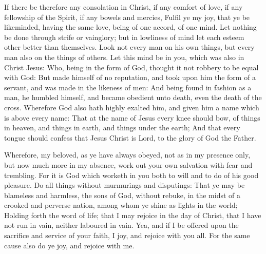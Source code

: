  If there be therefore any consolation in Christ, if any
comfort of love, if any fellowship of the Spirit, if any bowels and
mercies,  Fulfil ye my joy, that ye be likeminded, having
the same love, being of one accord, of one mind.  Let
nothing be done through strife or vainglory; but in lowliness of mind
let each esteem other better than themselves.  Look not
every man on his own things, but every man also on the things of others.
 Let this mind be in you, which was also in Christ Jesus:
 Who, being in the form of God, thought it not robbery to
be equal with God:  But made himself of no reputation, and
took upon him the form of a servant, and was made in the likeness of
men:  And being found in fashion as a man, he humbled
himself, and became obedient unto death, even the death of the cross.
 Wherefore God also hath highly exalted him, and given him
a name which is above every name:  That at the name of
Jesus every knee should bow, of things in heaven, and things in earth,
and things under the earth;  And that every tongue should
confess that Jesus Christ is Lord, to the glory of God the Father.

 Wherefore, my beloved, as ye have always obeyed, not as
in my presence only, but now much more in my absence, work out your own
salvation with fear and trembling.  For it is God which
worketh in you both to will and to do of his good pleasure.
 Do all things without murmurings and disputings:
 That ye may be blameless and harmless, the sons of God,
without rebuke, in the midst of a crooked and perverse nation, among
whom ye shine as lights in the world;  Holding forth the
word of life; that I may rejoice in the day of Christ, that I have not
run in vain, neither laboured in vain.  Yea, and if I be
offered upon the sacrifice and service of your faith, I joy, and rejoice
with you all.  For the same cause also do ye joy, and
rejoice with me.

